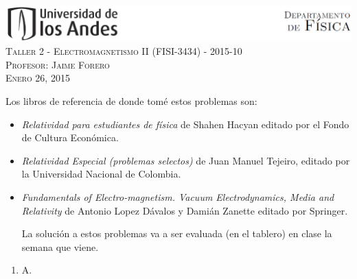 \documentclass[letterpaper,10pt,onecolumn]{article}
\begin{document}
\begin{center}

\includegraphics[width=490pt]{header.png}\\[0.5cm]

\textsc{\LARGE Taller 2 - Electromagnetismo II (FISI-3434) - 2015-10}\\[0.5cm]

\textsc{\Large{Profesor: Jaime Forero}} \\[0.5cm]

\textsc{Enero 26, 2015} \\[0.5cm]

\end{center}

Los libros de referencia de donde tom\'e estos problemas son:

\begin{itemize}
\item \textit{Relatividad para estudiantes de f\'isica} de Shahen Hacyan editado por el Fondo de Cultura Econ\'omica.

\item \textit{Relatividad Especial (problemas selectos)} de Juan Manuel Tejeiro, editado por la Universidad Nacional de Colombia.

\item \textit{Fundamentals of Electro-magnetism. Vacuum Electrodynamics, Media and Relativity} de Antonio Lopez D\'avalos y Dami\'an Zanette editado por Springer.

La soluci\'on a estos problemas va a ser evaluada (en el tablero) en clase la semana que viene. 

\end{itemize}

\begin{enumerate}
\item A.

\end{enumerate}
\end{document}
